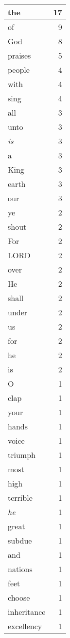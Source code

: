 \begin{center}
\begin{longtable}{l|r}
\hline \hline
\endlastfoot
the & 17 \\ \hline
of & 9 \\ \hline
God & 8 \\ \hline
praises & 5 \\ \hline
people & 4 \\ \hline
with & 4 \\ \hline
sing & 4 \\ \hline
all & 3 \\ \hline
unto & 3 \\ \hline
\emph{is} & 3 \\ \hline
a & 3 \\ \hline
King & 3 \\ \hline
earth & 3 \\ \hline
our & 3 \\ \hline
ye & 2 \\ \hline
shout & 2 \\ \hline
For & 2 \\ \hline
LORD & 2 \\ \hline
over & 2 \\ \hline
He & 2 \\ \hline
shall & 2 \\ \hline
under & 2 \\ \hline
us & 2 \\ \hline
for & 2 \\ \hline
he & 2 \\ \hline
is & 2 \\ \hline
O & 1 \\ \hline
clap & 1 \\ \hline
your & 1 \\ \hline
hands & 1 \\ \hline
voice & 1 \\ \hline
triumph & 1 \\ \hline
most & 1 \\ \hline
high & 1 \\ \hline
terrible & 1 \\ \hline
\emph{he} & 1 \\ \hline
great & 1 \\ \hline
subdue & 1 \\ \hline
and & 1 \\ \hline
nations & 1 \\ \hline
feet & 1 \\ \hline
choose & 1 \\ \hline
inheritance & 1 \\ \hline
excellency & 1 \\ \hline

\end{longtable}
\end{center}

